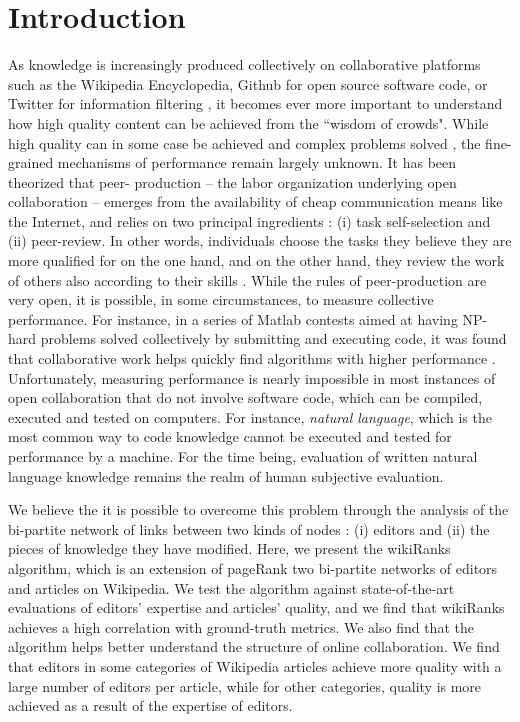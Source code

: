 \section{Introduction}
As knowledge is increasingly produced collectively on collaborative platforms 
such as the Wikipedia Encyclopedia, Github for open source software code, or 
Twitter for information filtering \cite{}, it becomes ever more important to 
understand how high quality content can be achieved from the ``wisdom of 
crowds". While  high quality can in some case be achieved \cite{giles2005internet} and  complex problems solved \cite{cooper2010}, the fine-grained mechanisms of 
performance remain largely unknown. It has been theorized that peer-
production -- the labor organization underlying open collaboration -- emerges 
from the availability of cheap communication means like the Internet, and relies 
on two principal ingredients : (i) task self-selection and (ii) peer-review. In other 
words, individuals choose the tasks they believe they are more qualified for on 
the one hand, and on the other hand, they review the work of others also 
according to their skills \cite{benkler2002}. While the rules of peer-production 
are very open, it is possible, in some circumstances, to measure collective 
performance. For instance, in a series of Matlab contests aimed at having NP-
hard problems solved collectively by submitting and executing code, it was 
found that collaborative work helps quickly find algorithms with higher 
performance \cite{gulley2010}. Unfortunately, measuring performance is 
nearly impossible in most instances of open collaboration that do not involve 
software code, which can be compiled, executed and tested on computers. For 
instance, {\it natural language}, which is the most common way to code 
knowledge cannot be executed and tested for performance by a machine. For 
the time being, evaluation of written natural language knowledge remains the 
realm of human subjective evaluation.

We believe the it is possible to overcome this problem through the analysis of the bi-partite network of links between two kinds of nodes : (i) editors and (ii) the pieces of knowledge they have modified. Here, we present the wikiRanks algorithm, which is an extension of pageRank two bi-partite networks of editors and articles on Wikipedia. We test the algorithm against state-of-the-art  evaluations of editors' expertise and articles' quality, and we find that wikiRanks  achieves a high correlation with ground-truth metrics. We also find that the algorithm helps better understand the structure of online collaboration. We find that editors in some categories of Wikipedia articles achieve more quality with a large number of editors per article, while for other categories, quality is more achieved as a result of the expertise of editors.

